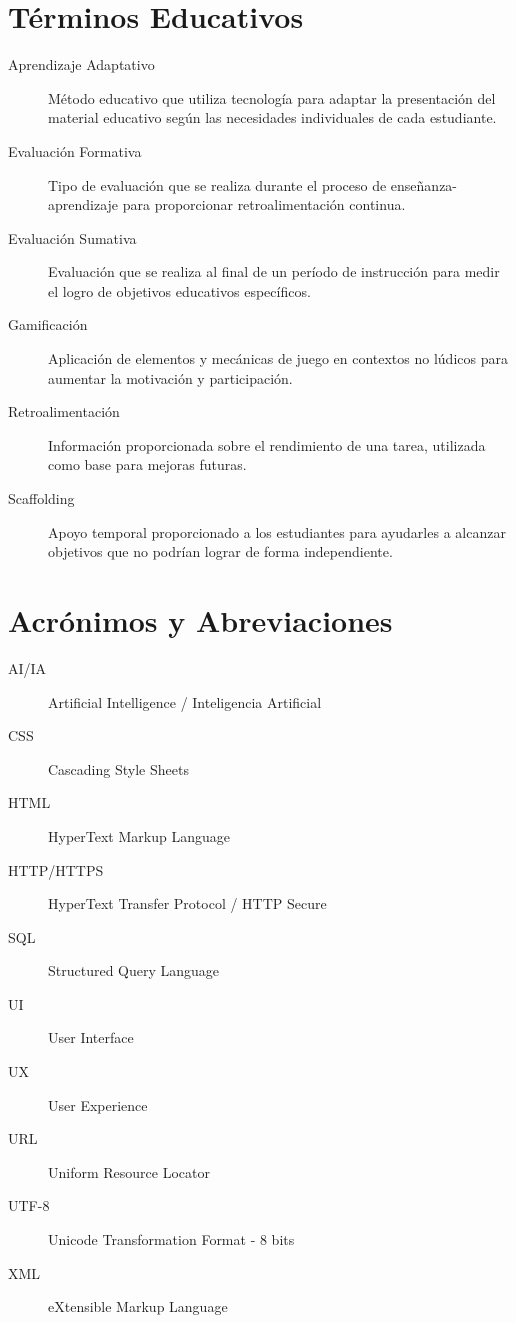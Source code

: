 \documentclass[12pt,a4paper]{report}
\begin{document}
\section{Términos Educativos}

\begin{description}
\item[Aprendizaje Adaptativo] Método educativo que utiliza tecnología para adaptar la presentación del material educativo según las necesidades individuales de cada estudiante.

\item[Evaluación Formativa] Tipo de evaluación que se realiza durante el proceso de enseñanza-aprendizaje para proporcionar retroalimentación continua.

\item[Evaluación Sumativa] Evaluación que se realiza al final de un período de instrucción para medir el logro de objetivos educativos específicos.

\item[Gamificación] Aplicación de elementos y mecánicas de juego en contextos no lúdicos para aumentar la motivación y participación.

\item[Retroalimentación] Información proporcionada sobre el rendimiento de una tarea, utilizada como base para mejoras futuras.

\item[Scaffolding] Apoyo temporal proporcionado a los estudiantes para ayudarles a alcanzar objetivos que no podrían lograr de forma independiente.
\end{description}

\section{Acrónimos y Abreviaciones}

\begin{description}
\item[AI/IA] Artificial Intelligence / Inteligencia Artificial
\item[CSS] Cascading Style Sheets
\item[HTML] HyperText Markup Language
\item[HTTP/HTTPS] HyperText Transfer Protocol / HTTP Secure
\item[SQL] Structured Query Language
\item[UI] User Interface
\item[UX] User Experience
\item[URL] Uniform Resource Locator
\item[UTF-8] Unicode Transformation Format - 8 bits
\item[XML] eXtensible Markup Language
\end{description}
\end{document}
